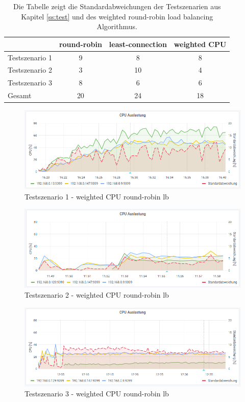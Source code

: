 \begin{table}[h!]
\centering
\renewcommand{\arraystretch}{1.5}
\begin{tabular}{|l|c|c|c|}
    \hline
    & round-robin & least-connection & weighted CPU \\
    \hline
    Testszenario 1 & 9 & 8 & 8 \\
    \hline
    Testszenario 2 & 3 & 10 & 4 \\
    \hline
    Testszenario 3 & 8 & 6 & 6 \\
    \hline
    \hline
    Gesamt & 20 & 24 & 18 \\
    \hline
\end{tabular}
\caption{Die Tabelle zeigt die Standardabweichungen der Testszenarien aus Kapitel \ref{ss:test} und des weighted round-robin load balancing Algorithmus.}
\label{table:test-output}
\end{table}

\begin{figure}[h!]
    \centering
    \includegraphics[scale=0.8]{images/s1_cpu.png}
    \caption{Testszenario 1 - weighted CPU round-robin \acl{lb}}
    \label{fig:s1-cpu}
\end{figure}

\begin{figure}[h!]
    \centering
    \includegraphics[scale=0.8]{images/s2_cpu.png}
    \caption{Testszenario 2 - weighted CPU round-robin \acl{lb}}
    \label{fig:s2-cpu}
\end{figure}

\begin{figure}[h!]
    \centering
    \includegraphics[scale=0.8]{images/s3_cpu.png}
    \caption{Testszenario 3 - weighted CPU round-robin \acl{lb}}
    \label{fig:s3-cpu}
\end{figure}

